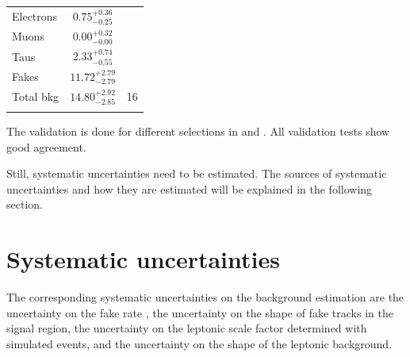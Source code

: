 \begin{table}[!h]
{\begin{tabular}{l|c |c}
\midrule
Electrons                                                      &       $0.75^{ + 0.36}_{ - 0.25}$            &                \\
Muons                                                          &       $0.00^{ + 0.32}_{- 0.00}$            &            \\
Taus                                                           &       $2.33^{ + 0.74}_{- 0.55}$            &          \\
Fakes                                                          &       $11.72^{ + 2.79}_{- 2.79}$            &          \\
\midrule
Total bkg                                                      &       $14.80^{ + 2.92}_{- 2.85}$            &  16        \\
\bottomrule
\multicolumn{3}{c}{} \\
\end{tabular}}
\end{table}




The validation is done for different selections in \pt and \ias.
All validation tests show good agreement.

Still, systematic uncertainties need to be estimated.
The sources of systematic uncertainties and how they are estimated will be explained in the following section.

\section{Systematic uncertainties}
\label{sec:SysUncertaintiesBkg}

The corresponding systematic uncertainties on the background estimation are the uncertainty on the fake rate \fakerate, the uncertainty on the \ias shape of fake tracks in the signal region, the uncertainty on the leptonic scale factor \leptonscalefactor determined with simulated events, and the uncertainty on the \ias shape of the leptonic background.  

